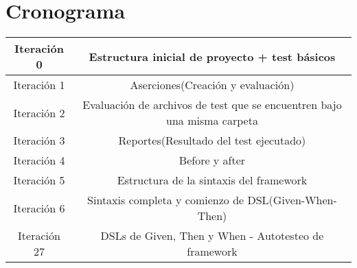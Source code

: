\documentclass{article}
\begin{document}
\section{Cronograma}
\begin{tabular}{ | c | c | }
 
 \hline Iteración 0 & Estructura inicial de proyecto + test básicos \\
 
 \hline Iteración 1 & Aserciones(Creación y evaluación) \\ 
 \hline Iteración 2 & Evaluación de archivos de test que se encuentren bajo una misma carpeta \\
 \hline Iteración 3 & Reportes(Resultado del test ejecutado) \\
 
 
  \hline Iteración 4 & Before y after \\
  
  
  \hline Iteración 5 & Estructura de la sintaxis del framework \\
  
  
  \hline Iteración 6 & Sintaxis completa y comienzo de DSL(Given-When-Then) \\
  
  
  \hline Iteración 27 & DSLs de Given, Then y When - Autotesteo de framework \\
 \hline
 \end{tabular}
\newpage
\end{document}
